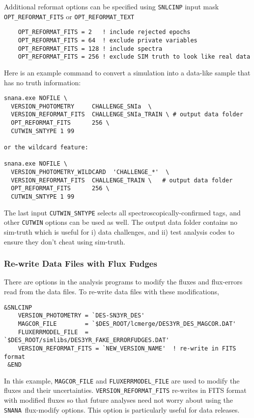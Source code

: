 \documentclass[12pt]{article}
\newcommand{\snana}{{\tt SNANA}}
\begin{document}
\medskip
Additional reformat options can be specified using {\tt SNLCINP} input mask
{\tt OPT\_REFORMAT\_FITS} or {\tt OPT\_REFORMAT\_TEXT}
\begin{verbatim}  
    OPT_REFORMAT_FITS = 2   ! include rejected epochs
    OPT_REFORMAT_FITS = 64  ! exclude private variables
    OPT_REFORMAT_FITS = 128 ! include spectra
    OPT_REFORMAT_FITS = 256 ! exclude SIM truth to look like real data
\end{verbatim}
%
Here is an example command to convert a simulation into a data-like
sample that has no truth information:
\begin{verbatim}    
snana.exe NOFILE \
  VERSION_PHOTOMETRY     CHALLENGE_SNIa  \
  VERSION_REFORMAT_FITS  CHALLENGE_SNIa_TRAIN \ # output data folder
  OPT_REFORMAT_FITS      256 \
  CUTWIN_SNTYPE 1 99

or the wildcard feature:

snana.exe NOFILE \
  VERSION_PHOTOMETRY_WILDCARD  'CHALLENGE_*'  \
  VERSION_REFORMAT_FITS  CHALLENGE_TRAIN \   # output data folder
  OPT_REFORMAT_FITS      256 \
  CUTWIN_SNTYPE 1 99

\end{verbatim}     
%
The last input {\tt CUTWIN\_SNTYPE} selects all 
spectroscopically-confirmed tags, and other {\tt CUTWIN} 
options can be used as well. 
The output data folder contains no sim-truth which
is useful for i) data challenges, and ii) test analysis codes
to ensure they don't cheat using sim-truth.

  \clearpage
  \subsubsection{Re-write Data Files with Flux Fudges}
  \label{sss:text2text}

There are options in the analysis programs to modify
the fluxes and flux-errors read from the data files. 
To re-write data files with these modifications,
%
\begin{Verbatim}[frame=single]
  &SNLCINP
    VERSION_PHOTOMETRY = `DES-SN3YR_DES'
    MAGCOR_FILE        = `$DES_ROOT/lcmerge/DES3YR_DES_MAGCOR.DAT'
    FLUXERRMODEL_FILE  = `$DES_ROOT/simlibs/DES3YR_FAKE_ERRORFUDGES.DAT'
    VERSION_REFORMAT_FITS = `NEW_VERSION_NAME'  ! re-write in FITS format
 &END
\end{Verbatim}
%
In this example, {\tt MAGCOR\_FILE} and {\tt FLUXERRMODEL\_FILE} 
are used to modify the fluxes and their uncertainties.
{\tt VERSION\_REFORMAT\_FITS} re-writes in FITS format with 
modified fluxes so that future analyses need not worry about
using the \snana\ flux-modify options. 
This option is particularly useful for data releases.
\end{document}
